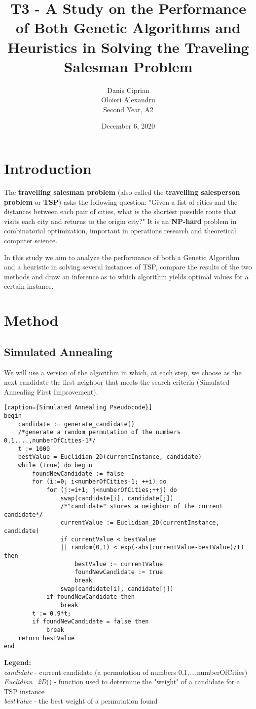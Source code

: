 \documentclass[a4paper]{article}
\title{T3 - A Study on the Performance of Both Genetic Algorithms and Heuristics in Solving the Traveling Salesman Problem}
\author{Daniș Ciprian\\
	Oloieri Alexandru \\
	Second Year, A2}
\date{December 6, 2020}
\begin{document}
\maketitle
\justify
\section{Introduction}

The \textbf{travelling salesman problem}\cite{tsp} (also called the \textbf{travelling salesperson problem} or \textbf{TSP}) asks the following question: "Given a list of cities and the distances between each pair of cities, what is the shortest possible route that visits each city and returns to the origin city?" It is an \textbf{NP-hard} problem in combinatorial optimization, important in operations research and theoretical computer science.

In this study we aim to analyze the performance of both a Genetic Algorithm and a heuristic in solving several instances of TSP, compare the results of the two methods and draw an inference as to which algorithm yields optimal values for a certain instance.

\section{Method}

\subsection{Simulated Annealing}

We will use a version of the algorithm in which, at each step, we choose as the next candidate the first neighbor that meets the search criteria (Simulated Annealing First Improvement).

\begin{lstlisting}[frame=single][caption={Simulated Annealing Pseudocode}]
begin
	candidate := generate_candidate() 
	/*generate a random permutation of the numbers 0,1,...,numberOfCities-1*/
	t := 1000
	bestValue = Euclidian_2D(currentInstance, candidate)
	while (true) do begin
		foundNewCandidate := false
		for (i:=0; i<numberOfCities-1; ++i) do
			for (j:=i+1; j<numberOfCities;++j) do
				swap(candidate[i], candidate[j])
				/*"candidate" stores a neighbor of the current candidate*/
				currentValue := Euclidian_2D(currentInstance, candidate)
				if currentValue < bestValue 
				|| random(0,1) < exp(-abs(currentValue-bestValue)/t) then
					bestValue := currentValue
					foundNewCandidate := true
					break
				swap(candidate[i], candidate[j])
			if foundNewCandidate then
				break
		t := 0.9*t;
		if foundNewCandidate = false then
			break
	return bestValue
end
\end{lstlisting}
\justify
\textbf{Legend:}\\
{\itshape candidate} - current candidate (a permutation of numbers 0,1,...,numberOfCities)\\
{\itshape Euclidian\_2D}() - function used to determine the "weight" of a candidate for a TSP instance\\
{\itshape bestValue} - the best weight of a permutation found
\end{document}
